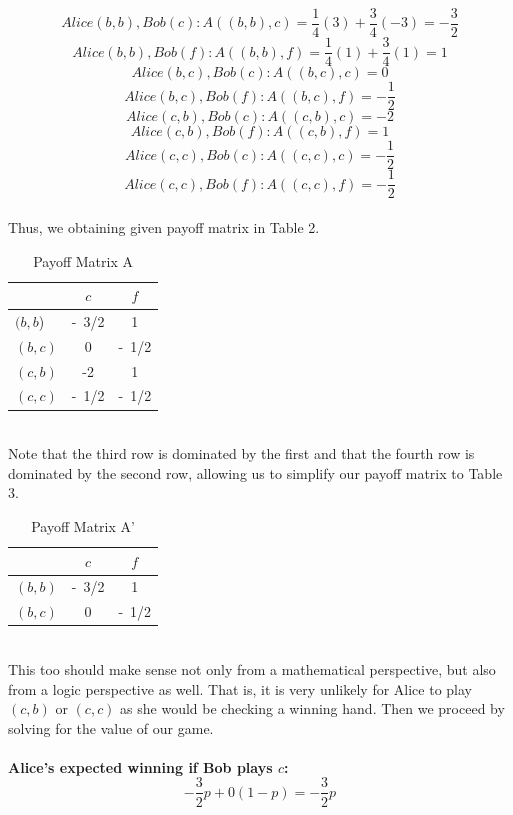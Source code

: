 \documentclass[12pt]{article}
\begin{document}
\[
    Alice (b, b), Bob (c): A((b, b), c) = \frac{1}{4}(3) + \frac{3}{4}(-3) = -\frac{3}{2}
\]
\[
    Alice (b, b), Bob (f): A((b, b), f) = \frac{1}{4}(1) + \frac{3}{4}(1) = 1
\]
\[
    Alice (b, c), Bob (c): A((b, c), c) = 0
\]
\[
    Alice (b, c), Bob (f): A((b, c), f) = -\frac{1}{2}
\]
\[
    Alice (c, b), Bob (c): A((c, b), c) = -2
\]
\[
    Alice (c, b), Bob (f): A((c, b), f) = 1
\]
\[
    Alice (c, c), Bob (c): A((c, c), c) = -\frac{1}{2}
\]
\[
    Alice (c, c), Bob (f): A((c, c), f) = -\frac{1}{2}
\]
\\
Thus, we obtaining given payoff matrix in Table 2.
\begin{table}[h]
    \centering
    \begin{tabular}{|l|c|c|}
        \hline
        & $c$ & $f$ \\ \hline
        $(b, b$) & -~3/2 & 1 \\ \hline
        $(b, c)$ & 0 & -~1/2 \\ \hline
        $(c, b)$ & -2 & 1 \\ \hline
        $(c, c)$ & -~1/2 & -~1/2 \\ \hline
    \end{tabular}
    \caption{Payoff Matrix A}
    \label{tab:payoff_matrix}
\end{table}
\\
Note that the third row is dominated by the first and that the fourth row is dominated by the second row, allowing us to simplify our payoff matrix to Table 3.
\begin{table}[h]
    \centering
    \begin{tabular}{|l|c|c|}
        \hline
        & $c$ & $f$ \\ \hline
        $(b, b)$ & -~3/2 & 1 \\ \hline
        $(b, c)$ & 0 & -~1/2 \\ \hline
    \end{tabular}
    \caption{Payoff Matrix A'}
    \label{tab:payoff_matrix}
\end{table}
\\
This too should make sense not only from a mathematical perspective, but also from a logic perspective as well. That is, it is very unlikely for Alice to play $(c, b)$ or $(c, c)$ as she would be checking a winning hand. Then we proceed by solving for the value of our game.
\\
\\
\textbf{Alice's expected winning if Bob plays $c$:}
\\
\[
    -\frac{3}{2}p + 0(1 - p) = -\frac{3}{2}p
\]
\end{document}
